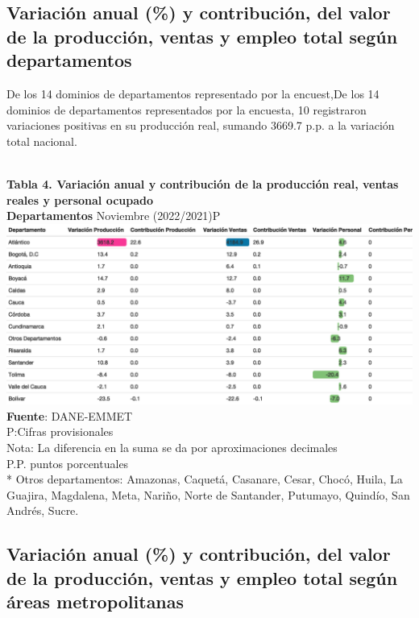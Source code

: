 \documentclass[
]{article}
\begin{document}
\hypertarget{variaciuxf3n-anual-y-contribuciuxf3n-del-valor-de-la-producciuxf3n-ventas-y-empleo-total-seguxfan-departamentos}{%
\subsection{Variación anual (\%) y contribución, del valor de la
producción, ventas y empleo total según
departamentos}\label{variaciuxf3n-anual-y-contribuciuxf3n-del-valor-de-la-producciuxf3n-ventas-y-empleo-total-seguxfan-departamentos}}

De los 14 dominios de departamentos representado por la encuest,De los
14 dominios de departamentos representados por la encuesta, 10
registraron variaciones positivas en su producción real, sumando 3669.7
p.p. a la variación total nacional.\\
\strut \\
\textbf{Tabla 4. Variación anual y contribución de la producción real, ventas reales y personal ocupado}\\
\textbf{Departamentos} Noviembre (2022/2021)P
\includegraphics{boletin_files/figure-latex/tabla4_new-1.png}
\textbf{Fuente}: DANE-EMMET\\
P:Cifras provisionales\\
Nota: La diferencia en la suma se da por aproximaciones decimales\\
P.P. puntos porcentuales\\
* Otros departamentos: Amazonas, Caquetá, Casanare, Cesar, Chocó, Huila,
La Guajira, Magdalena, Meta, Nariño, Norte de Santander, Putumayo,
Quindío, San Andrés, Sucre.

\hypertarget{variaciuxf3n-anual-y-contribuciuxf3n-del-valor-de-la-producciuxf3n-ventas-y-empleo-total-seguxfan-uxe1reas-metropolitanas}{%
\subsection{Variación anual (\%) y contribución, del valor de la
producción, ventas y empleo total según áreas
metropolitanas}\label{variaciuxf3n-anual-y-contribuciuxf3n-del-valor-de-la-producciuxf3n-ventas-y-empleo-total-seguxfan-uxe1reas-metropolitanas}}
\end{document}
